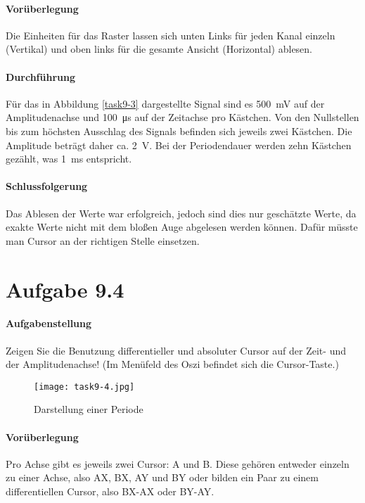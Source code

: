 \paragraph{Vorüberlegung}
Die Einheiten für das Raster lassen sich unten Links für jeden Kanal einzeln (Vertikal) und oben links für die gesamte Ansicht (Horizontal) ablesen.

\paragraph{Durchführung}
Für das in Abbildung \vref{task9-3} dargestellte Signal sind es \SI{500}{\milli\volt} auf der Amplitudenachse und \SI{100}{\micro\second} auf der Zeitachse pro Kästchen. Von den Nullstellen bis zum höchsten Ausschlag des Signals befinden sich jeweils zwei Kästchen. Die Amplitude beträgt daher ca. \SI{2}{\volt}. Bei der Periodendauer werden zehn Kästchen gezählt, was \SI{1}{\milli\second} entspricht.

\paragraph{Schlussfolgerung}
Das Ablesen der Werte war erfolgreich, jedoch sind dies nur geschätzte Werte, da exakte Werte nicht mit dem bloßen Auge abgelesen werden können. Dafür müsste man Cursor an der richtigen Stelle einsetzen.

\section{Aufgabe 9.4}

\paragraph{Aufgabenstellung}
Zeigen Sie die Benutzung differentieller und absoluter Cursor auf der Zeit- und der Amplitudenachse! (Im Menüfeld des Oszi befindet sich die Cursor-Taste.)

\begin{wrapfigure}[10]{r}{.4\textwidth}
	\texttt{[image: task9-4.jpg]}
	\caption{Darstellung einer Periode}
	\label{task9-4}
\end{wrapfigure}

\paragraph{Vorüberlegung}
Pro Achse gibt es jeweils zwei Cursor: A und B. Diese gehören entweder einzeln zu einer Achse, also AX, BX, AY und BY oder bilden ein Paar zu einem differentiellen Cursor, also BX-AX oder BY-AY.

